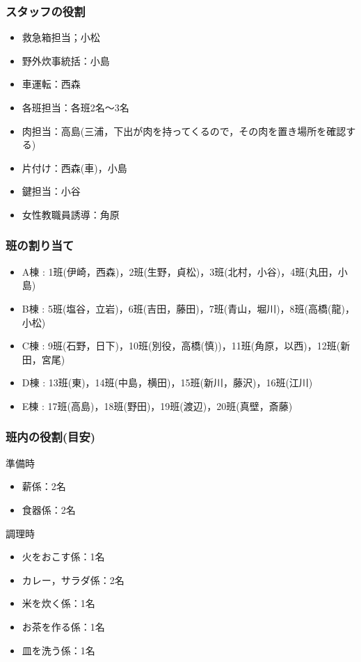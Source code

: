 \subsubsection{スタッフの役割}
\begin{itemize}
  \item 救急箱担当；小松
  \item 野外炊事統括：小島
  \item 車運転：西森
  \item 各班担当：各班2名〜3名
  \item 肉担当：高島(三浦，下出が肉を持ってくるので，その肉を置き場所を確認する)
　\item 片付け：西森(車)，小島
  \item 鍵担当：小谷
  \item 女性教職員誘導：角原
\end{itemize}

\subsubsection{班の割り当て}
\begin{itemize}
 \item A棟 : 1班(伊崎，西森)，2班(生野，貞松)，3班(北村，小谷)，4班(丸田，小島)
 \item B棟 : 5班(塩谷，立岩)，6班(吉田，藤田)，7班(青山，堀川)，8班(高橋(龍)，小松)
 \item C棟 : 9班(石野，日下)，10班(別役，高橋(慎))，11班(角原，以西)，12班(新田，宮尾)
 \item D棟 : 13班(東)，14班(中島，横田)，15班(新川，藤沢)，16班(江川)
 \item E棟 : 17班(高島)，18班(野田)，19班(渡辺)，20班(真壁，斎藤)
\end{itemize}

\subsubsection{班内の役割(目安)}

準備時
\begin{itemize}
  \item 薪係：2名
  \item 食器係：2名
\end{itemize}

調理時
\begin{itemize}
  \item 火をおこす係：1名
  \item カレー，サラダ係：2名
  \item 米を炊く係：1名
  \item お茶を作る係：1名
  \item 皿を洗う係：1名
\end{itemize}


